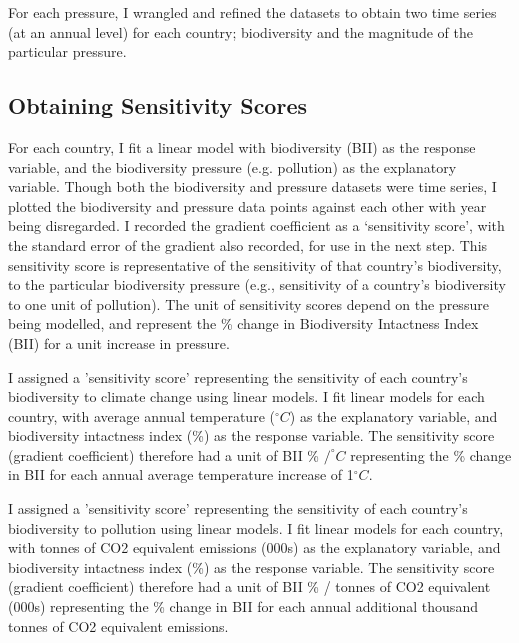 \documentclass[11pt, a4paper, titlepage]{article}
\begin{document}
	For each pressure, I wrangled and refined the datasets to obtain two time series (at an annual level) for each country; biodiversity and the magnitude of the particular pressure.
	
	
	\subsection*{Obtaining Sensitivity Scores}
	
	For each country, I fit a linear model with biodiversity (BII) as the response variable, and the biodiversity pressure (e.g. pollution) as the explanatory variable. Though both the biodiversity and pressure datasets were time series, I plotted the biodiversity and pressure data points against each other with year being disregarded. I recorded the gradient coefficient as a `sensitivity score', with the standard error of the gradient also recorded, for use in the next step. This sensitivity score is representative of the sensitivity of that country's biodiversity, to the particular biodiversity pressure (e.g., sensitivity of a country's biodiversity to one unit of pollution). The unit of sensitivity scores depend on the pressure being modelled, and represent the \% change in Biodiversity Intactness Index (BII) for a unit increase in pressure.  
	
	I assigned a 'sensitivity score' representing the sensitivity of each country's biodiversity to climate change using linear models. I fit linear models for each country, with average annual temperature ($^\circ C$) as the explanatory variable, and biodiversity intactness index (\%) as the response variable. The sensitivity score (gradient coefficient) therefore had a unit of BII \% $/ ^\circ C$ representing the \% change in BII for each annual average temperature increase of 1$^\circ C$.
	
	I assigned a 'sensitivity score' representing the sensitivity of each country's biodiversity to pollution using linear models. I fit linear models for each country, with tonnes of CO2 equivalent emissions (000s) as the explanatory variable, and biodiversity intactness index (\%) as the response variable. The sensitivity score (gradient coefficient) therefore had a unit of BII \% / tonnes of CO2 equivalent (000s) representing the \% change in BII for each annual additional thousand tonnes of CO2 equivalent emissions. 
	
\end{document}
